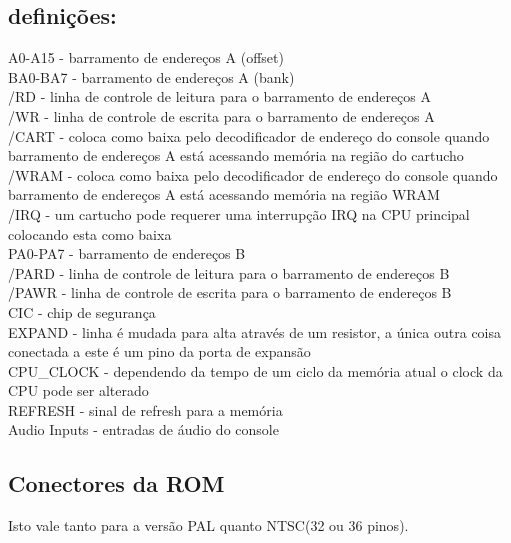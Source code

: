 \documentclass[paper=a4, fontsize=11pt]{scrartcl}	%
\numberwithin{equation}{section}															%
\numberwithin{figure}{section}																%
\numberwithin{table}{section}																%
\begin{document}
\subsection*{definições:}
A0-A15  - barramento de endereços A (offset)\\
BA0-BA7 - barramento de endereços A (bank)\\
/RD - linha de controle de leitura para o barramento de endereços A\\
/WR - linha de controle de escrita para o barramento de endereços A\\
/CART - coloca como baixa pelo decodificador de endereço do console quando barramento de endereços A está acessando memória na região do cartucho\\
/WRAM - coloca como baixa pelo decodificador de endereço do console quando barramento de endereços A está acessando memória na região WRAM\\
/IRQ - um cartucho pode requerer uma interrupção IRQ na CPU principal colocando esta como baixa\\
PA0-PA7 - barramento de endereços B\\
/PARD - linha de controle de leitura para o barramento de endereços B\\
/PAWR - linha de controle de escrita para o barramento de endereços B\\
CIC - chip de segurança\\
EXPAND - linha é mudada para alta através de um resistor, a única outra coisa conectada a este é um pino da porta de expansão\\
CPU\_CLOCK - dependendo da tempo de um ciclo da memória atual o clock da CPU pode ser alterado\\
REFRESH - sinal de refresh para a memória\\
Audio Inputs - entradas de áudio do console\\

\subsection*{Conectores da ROM}
Isto vale tanto para a versão PAL quanto NTSC(32 ou 36 pinos).\\
\end{document}

